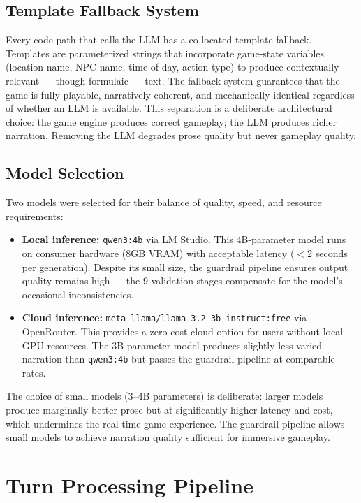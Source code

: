 \documentclass[12pt, a4paper, oneside]{report}
\begin{document}
\subsection{Template Fallback System}

Every code path that calls the LLM has a co-located template fallback. Templates are parameterized strings that incorporate game-state variables (location name, NPC name, time of day, action type) to produce contextually relevant --- though formulaic --- text. The fallback system guarantees that the game is fully playable, narratively coherent, and mechanically identical regardless of whether an LLM is available. This separation is a deliberate architectural choice: the game engine produces correct gameplay; the LLM produces richer narration. Removing the LLM degrades prose quality but never gameplay quality.

\subsection{Model Selection}

Two models were selected for their balance of quality, speed, and resource requirements:

\begin{itemize}[nosep]
    \item \textbf{Local inference:} \texttt{qwen3:4b} via LM Studio. This 4B-parameter model runs on consumer hardware (8GB VRAM) with acceptable latency ($<$2 seconds per generation). Despite its small size, the guardrail pipeline ensures output quality remains high --- the 9 validation stages compensate for the model's occasional inconsistencies.
    \item \textbf{Cloud inference:} \texttt{meta-llama/llama-3.2-3b-instruct:free} via OpenRouter. This provides a zero-cost cloud option for users without local GPU resources. The 3B-parameter model produces slightly less varied narration than \texttt{qwen3:4b} but passes the guardrail pipeline at comparable rates.
\end{itemize}

The choice of small models (3--4B parameters) is deliberate: larger models produce marginally better prose but at significantly higher latency and cost, which undermines the real-time game experience. The guardrail pipeline allows small models to achieve narration quality sufficient for immersive gameplay.

\section{Turn Processing Pipeline}
\label{sec:turn-pipeline}
\end{document}
